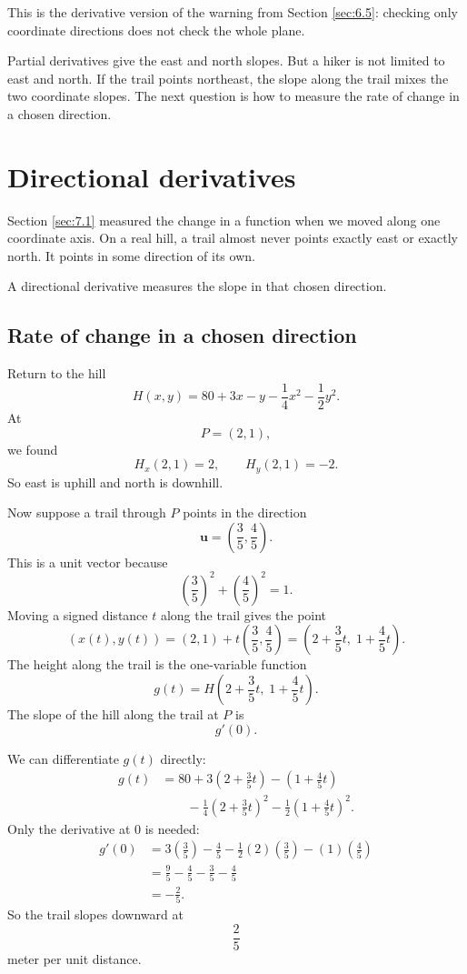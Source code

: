 This is the derivative version of the warning from Section \ref{sec:6.5}: checking only
coordinate directions does not check the whole plane.

Partial derivatives give the east and north slopes.  But a hiker is not limited to east
and north.  If the trail points northeast, the slope along the trail mixes the two
coordinate slopes.  The next question is how to measure the rate of change in a chosen
direction.

\section{Directional derivatives}
\label{sec:7.2}

Section \ref{sec:7.1} measured the change in a function when we moved along one
coordinate axis.  On a real hill, a trail almost never points exactly east or exactly north.
It points in some direction of its own.

A directional derivative measures the slope in that chosen direction.

\subsection{Rate of change in a chosen direction}

Return to the hill
\[
    H(x,y)=80+3x-y-\frac14x^2-\frac12y^2.
\]
At
\[
    P=(2,1),
\]
we found
\[
    H_x(2,1)=2,
    \qquad
    H_y(2,1)=-2.
\]
So east is uphill and north is downhill.

Now suppose a trail through \(P\) points in the direction
\[
    \mathbf u=\left(\frac35,\frac45\right).
\]
This is a unit vector because
\[
    \left(\frac35\right)^2+\left(\frac45\right)^2=1.
\]
Moving a signed distance \(t\) along the trail gives the point
\[
    (x(t),y(t))
    =
    (2,1)+t\left(\frac35,\frac45\right)
    =
    \left(2+\frac35t,\;1+\frac45t\right).
\]
The height along the trail is the one-variable function
\[
    g(t)=H\left(2+\frac35t,\;1+\frac45t\right).
\]
The slope of the hill along the trail at \(P\) is
\[
    g'(0).
\]

We can differentiate \(g(t)\) directly:
\[
\begin{aligned}
g(t)
&=
80
+3\left(2+\frac35t\right)
-\left(1+\frac45t\right) \\
&\qquad
-\frac14\left(2+\frac35t\right)^2
-\frac12\left(1+\frac45t\right)^2.
\end{aligned}
\]
Only the derivative at \(0\) is needed:
\[
\begin{aligned}
g'(0)
&=
3\left(\frac35\right)
-\frac45
-\frac12(2)\left(\frac35\right)
-(1)\left(\frac45\right)   \\
&=
\frac95-\frac45-\frac35-\frac45 \\
&=
-\frac25.
\end{aligned}
\]
So the trail slopes downward at
\[
    \frac25
\]
meter per unit distance.


